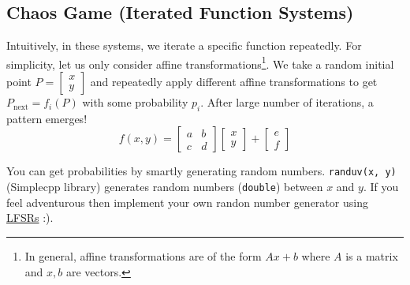 \subsection{Chaos Game (Iterated Function Systems)}
Intuitively, in these systems, we iterate a specific function repeatedly. For simplicity, let us only consider affine transformations\footnote{In general, affine transformations are of the form $Ax+b$ where $A$ is a matrix and $x,b$ are vectors.}. We take a random initial point $P=\begin{bmatrix}x\\y\end{bmatrix}$ and repeatedly apply different affine transformations to get $P_{\text{next}}=f_i(P)$ with some probability $p_i$. After large number of iterations, a pattern emerges!
\begin{equation}
	f(x,y)={\begin{bmatrix}a&b\\c&d\end{bmatrix}}{\begin{bmatrix}x\\y\end{bmatrix}}+{\begin{bmatrix}e\\f\end{bmatrix}}
\end{equation}
\begin{note}
	You can get probabilities by smartly generating random numbers. \verb!randuv(x, y)! (Simplecpp library) generates random numbers (\verb!double!) between $x$ and $y$. If you feel adventurous then implement your own randon number generator using \hyperref[pp:linearfeedbackshiftregister]{LFSRs} :).
\end{note}
